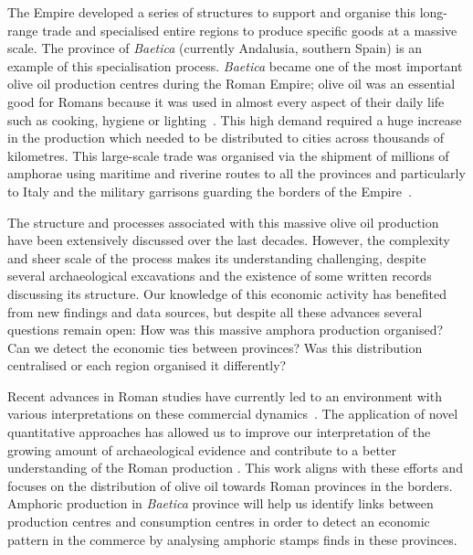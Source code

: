 The Empire developed a series of structures to support and organise this long-range trade and specialised entire regions to produce specific goods at a massive scale. The province of \textit{Baetica} (currently Andalusia, southern Spain) is an example of this specialisation process. \textit{Baetica} became one of the most important olive oil production centres during the Roman Empire; olive oil was an essential good for Romans because it was used in almost every aspect of their daily life such as cooking, hygiene or lighting~\citep{mattingly_d.j._oil_1988}. This high demand required a huge increase in the production which needed to be distributed to cities across thousands of kilometres. This large-scale trade was organised via the shipment of millions of amphorae using maritime and riverine routes to all the provinces and particularly to Italy and the military garrisons guarding the borders of the Empire~\citep{blazquez_exportacion_1980}. 

The structure and processes associated with this massive olive oil production have been extensively discussed over the last decades\citep{rodriguez_economioleicola_1977, duncan1982economy, Chic_hispania_1997,millet_anforas_1998}. However, the complexity and sheer scale of the process makes its understanding challenging, 
despite several archaeological excavations and the existence of some written records discussing its structure. Our knowledge of this economic activity has benefited from new findings and data sources, but despite all these advances several questions remain open: How was this massive amphora production organised? Can we detect the economic ties between provinces? Was this distribution centralised or each region organised it differently?

Recent advances in Roman studies have currently led to an environment with various interpretations on these commercial dynamics~\citep{temin_economy_2006,quantifyingwilson2009}. %
The application of novel quantitative approaches has allowed us to improve our interpretation of the growing amount of archaeological evidence and contribute to a better understanding of the Roman production
\citep{brughmans_roman_2016,orengo_seeds_2016,bayesian_2018,coto-sarmiento_identifying_2018,rubio-campillo_ecology_2018}. This work aligns with these efforts and focuses on the distribution of olive oil towards Roman provinces in the borders. Amphoric production in \textit{Baetica} province will help us identify links between production centres and consumption centres in order to detect an economic pattern in the commerce by analysing amphoric stamps finds in these provinces. 

